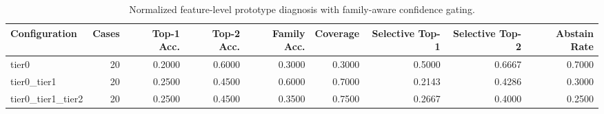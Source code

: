 \begin{table}[t]
\centering
\caption{Normalized feature-level prototype diagnosis with family-aware confidence gating.}
\label{tab:dice_stressor_hierarchical_diagnosis}
\footnotesize
\begin{tabular}{lrrrrrrrr}
\toprule
Configuration & Cases & Top-1 Acc. & Top-2 Acc. & Family Acc. & Coverage & Selective Top-1 & Selective Top-2 & Abstain Rate \\
\midrule
tier0 & 20 & 0.2000 & 0.6000 & 0.3000 & 0.3000 & 0.5000 & 0.6667 & 0.7000 \\
tier0_tier1 & 20 & 0.2500 & 0.4500 & 0.6000 & 0.7000 & 0.2143 & 0.4286 & 0.3000 \\
tier0_tier1_tier2 & 20 & 0.2500 & 0.4500 & 0.3500 & 0.7500 & 0.2667 & 0.4000 & 0.2500 \\
\bottomrule
\end{tabular}

\end{table}
